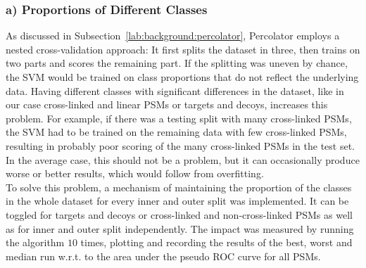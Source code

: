 \subsubsection{a) Proportions of Different Classes}
\label{lab:matmet:proportions}
As discussed in Subsection~\ref{lab:background:percolator}, Percolator employs a nested cross-validation approach: It first splits the dataset in three, then trains on two parts and scores the remaining part. If the splitting was uneven by chance, the SVM would be trained on class proportions that do not reflect the underlying data. Having different classes with significant differences in the dataset, like in our case cross-linked and linear PSMs or targets and decoys, increases this problem. For example, if there was a testing split with many cross-linked PSMs, the SVM had to be trained on the remaining data with few cross-linked PSMs, resulting in probably poor scoring of the many cross-linked PSMs in the test set. In the average case, this should not be a problem, but it can occasionally produce worse or better results, which would follow from overfitting.\\
To solve this problem, a mechanism of maintaining the proportion of the classes in the whole dataset for every inner and outer split was implemented. It can be toggled for targets and decoys or cross-linked and non-cross-linked PSMs as well as for inner and outer split independently. The impact was measured by running the algorithm $10$ times, plotting and recording the results of the best, worst and median run w.r.t. to the area under the pseudo ROC curve for all PSMs.%
